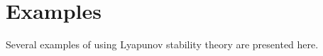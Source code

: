 
\mainmatter
\setcounter{page}{1}

\lectureseries[\course]{\course}

\date{January 28, 2010}

\setaddress

\setcounter{lecture}{7}
\setcounter{chapter}{7}


\section{Examples}
Several examples of using Lyapunov stability theory are presented here.

